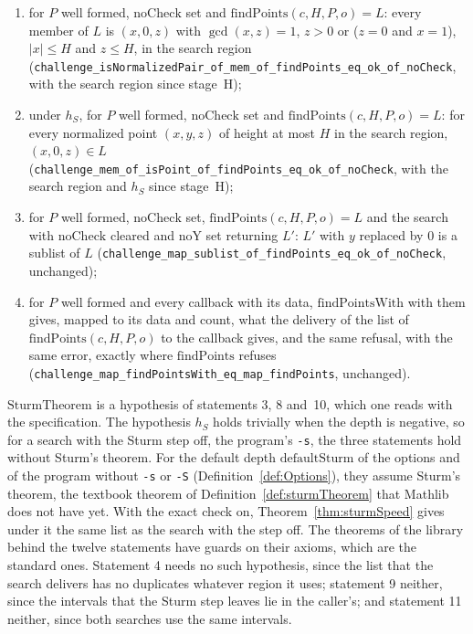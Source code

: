 \begin{enumerate}
  \item[9.] for $P$ well formed, $\mathrm{noCheck}$ set and $\mathrm{findPoints}(c, H, P, o) = L$:
    every member of $L$ is $(x, 0, z)$ with $\gcd(x, z) = 1$, $z > 0$ or ($z = 0$ and $x = 1$),
    $|x| \le H$ and $z \le H$, in the search region
    (\verb|challenge_isNormalizedPair_of_mem_of_findPoints_eq_ok_of_noCheck|, with the search region since
    stage~H);
  \item[10.] under $h_S$, for $P$ well formed, $\mathrm{noCheck}$ set and
    $\mathrm{findPoints}(c, H, P, o) = L$: for every normalized point $(x, y, z)$ of height at most
    $H$ in the search region, $(x, 0, z) \in L$
    (\verb|challenge_mem_of_isPoint_of_findPoints_eq_ok_of_noCheck|, with the search region and
    $h_S$ since stage~H);
  \item[11.] for $P$ well formed, $\mathrm{noCheck}$ set, $\mathrm{findPoints}(c, H, P, o) = L$ and
    the search with $\mathrm{noCheck}$ cleared and $\mathrm{noY}$ set returning $L'$: $L'$ with $y$
    replaced by $0$ is a sublist of $L$
    (\verb|challenge_map_sublist_of_findPoints_eq_ok_of_noCheck|, unchanged);
  \item[12.] for $P$ well formed and every callback with its data, $\mathrm{findPointsWith}$ with
    them gives, mapped to its data and count, what the delivery of the list of
    $\mathrm{findPoints}(c, H, P, o)$ to the callback gives, and the same refusal, with the same
    error, exactly where $\mathrm{findPoints}$ refuses
    (\verb|challenge_map_findPointsWith_eq_map_findPoints|, unchanged).
\end{enumerate}
$\mathrm{SturmTheorem}$ is a hypothesis of statements 3, 8 and~10, which one reads with the
specification. The hypothesis $h_S$ holds trivially when the depth is negative, so for a search with
the Sturm step off, the program's \verb|-s|, the three statements hold without Sturm's theorem. For
the default depth $\mathrm{defaultSturm}$ of the options and of the program without \verb|-s| or
\verb|-S| (Definition~\ref{def:Options}), they assume Sturm's theorem, the textbook theorem of
Definition~\ref{def:sturmTheorem} that Mathlib does not have yet. With the exact check on,
Theorem~\ref{thm:sturmSpeed} gives under it the same list as the search with the step off. The
theorems of the library behind the twelve statements have guards on their axioms, which are the
standard ones. Statement 4 needs no such hypothesis, since the list that the search delivers has no
duplicates whatever region it uses; statement 9 neither, since the intervals that the Sturm step
leaves lie in the caller's; and statement 11 neither, since both searches use the same intervals.

